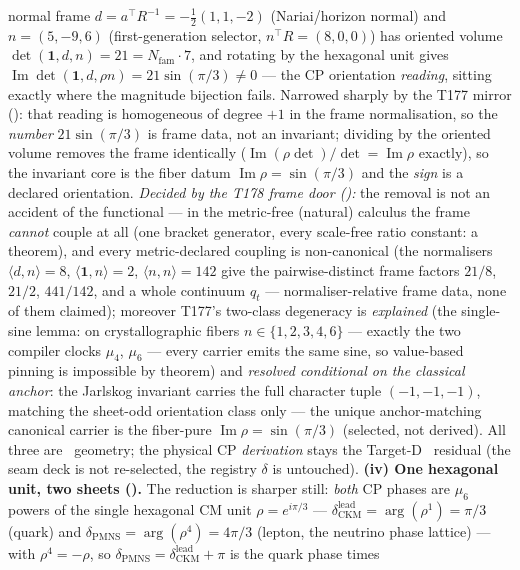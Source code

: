 \documentclass[11pt,a4paper]{article}
\newcommand{\Nfam}{N_{\mathrm{fam}}}
\begin{document}
\begin{winbox}
normal frame $d=a^\top R^{-1}=-\tfrac12(1,1,-2)$ (Nariai/horizon normal) and $n=(5,-9,6)$ (first-generation
selector, $n^\top R=(8,0,0)$) has oriented volume $\det(\mathbf1,d,n)=21=\Nfam\cdot7$, and rotating by the
hexagonal unit gives $\operatorname{Im}\det(\mathbf1,d,\rho n)=21\sin(\pi/3)\neq0$ --- the CP orientation
\emph{reading}, sitting exactly where the magnitude bijection fails. Narrowed sharply by the T177
mirror (): that reading is homogeneous of degree $+1$ in the
frame normalisation, so the \emph{number} $21\sin(\pi/3)$ is frame data, not an invariant; dividing by
the oriented volume removes the frame identically
($\operatorname{Im}(\rho\det)/\det=\operatorname{Im}\rho$ exactly), so the invariant core is the fiber
datum $\operatorname{Im}\rho=\sin(\pi/3)$ and the \emph{sign} is a declared orientation.
\emph{Decided by the T178 frame door ():} the removal is not an accident
of the functional --- in the metric-free (natural) calculus the frame \emph{cannot} couple at all
(one bracket generator, every scale-free ratio constant: a theorem), and every metric-declared
coupling is non-canonical (the normalisers $\langle d,n\rangle=8$, $\langle\mathbf1,n\rangle=2$,
$\langle n,n\rangle=142$ give the pairwise-distinct frame factors $21/8$, $21/2$, $441/142$, and a
whole continuum $q_t$ --- normaliser-relative frame data, none of them claimed); moreover T177's
two-class degeneracy is \emph{explained} (the single-sine lemma: on crystallographic fibers
$n\in\{1,2,3,4,6\}$ --- exactly the two compiler clocks $\mu_4$, $\mu_6$ --- every carrier emits the
same sine, so value-based pinning is impossible by theorem) and \emph{resolved conditional on the
classical anchor}: the Jarlskog invariant carries the full character tuple $(-1,-1,-1)$, matching the
sheet-odd orientation class only --- the unique anchor-matching canonical carrier is the fiber-pure
$\operatorname{Im}\rho=\sin(\pi/3)$ (selected, not derived). All three are \mE\
geometry; the physical CP \emph{derivation} stays the Target-D \mC\ residual (the seam deck is not
re-selected, the registry $\delta$ is untouched). \textbf{(iv) One hexagonal unit, two sheets
(\veri{v231\_cp\_mu6\_phases.py}).} The reduction is sharper still: \emph{both} CP phases are $\mu_6$ powers
of the single hexagonal CM unit $\rho=e^{i\pi/3}$ --- $\delta_{\mathrm{CKM}}^{\mathrm{lead}}=\arg(\rho^1)
=\pi/3$ (quark) and $\delta_{\mathrm{PMNS}}=\arg(\rho^4)=4\pi/3$ (lepton, the neutrino phase lattice) --- with
$\rho^4=-\rho$, so $\delta_{\mathrm{PMNS}}=\delta_{\mathrm{CKM}}^{\mathrm{lead}}+\pi$ is the quark phase times

\end{winbox}
\end{document}
